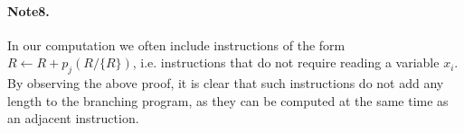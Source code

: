 \paragraph{Note8.} In our computation we often include instructions of the form $R\leftarrow R+p_j(R/\{R\})$, i.e. instructions that do not require reading a variable $x_i$. By observing the above proof, it is clear that such instructions do not add any length to the branching program, as they can be computed at the same time as an adjacent instruction.
